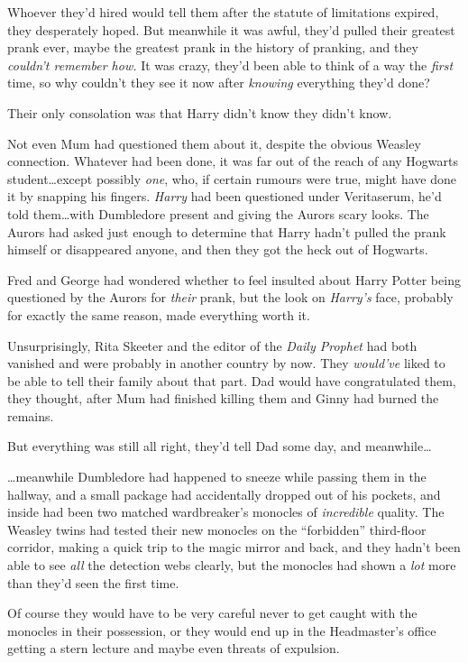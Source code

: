 Whoever they’d hired would tell them after the statute of limitations expired,
they desperately hoped. But meanwhile it was awful, they’d pulled their
greatest prank ever, maybe the greatest prank in the history of pranking, and
they \emph{couldn’t remember how.} It was crazy, they’d been able to think of a
way the \emph{first} time, so why couldn’t they see it now after \emph{knowing}
everything they’d done?

Their only consolation was that Harry didn’t know they didn’t know.

Not even Mum had questioned them about it, despite the obvious Weasley
connection. Whatever had been done, it was far out of the reach of any Hogwarts
student…except possibly \emph{one}, who, if certain rumours were true,
might have done it by snapping his fingers. \emph{Harry} had been questioned
under Veritaserum, he’d told them…with Dumbledore present and giving
the Aurors scary looks. The Aurors had asked just enough to determine that
Harry hadn’t pulled the prank himself or disappeared anyone, and then they got
the heck out of Hogwarts.

Fred and George had wondered whether to feel insulted about Harry Potter being
questioned by the Aurors for \emph{their} prank, but the look on \emph{Harry’s}
face, probably for exactly the same reason, made everything worth it.

Unsurprisingly, Rita Skeeter and the editor of the \emph{Daily Prophet} had
both vanished and were probably in another country by now. They \emph{would’ve}
liked to be able to tell their family about that part. Dad would have
congratulated them, they thought, after Mum had finished killing them and Ginny
had burned the remains.

But everything was still all right, they’d tell Dad some day, and
meanwhile…

…meanwhile Dumbledore had happened to sneeze while passing them in the
hallway, and a small package had accidentally dropped out of his pockets, and
inside had been two matched wardbreaker’s monocles of \emph{incredible}
quality. The Weasley twins had tested their new monocles on the “forbidden”
third-floor corridor, making a quick trip to the magic mirror and back, and
they hadn’t been able to see \emph{all} the detection webs clearly, but the
monocles had shown a \emph{lot} more than they’d seen the first time.

Of course they would have to be very careful never to get caught with the
monocles in their possession, or they would end up in the Headmaster’s office
getting a stern lecture and maybe even threats of expulsion.

